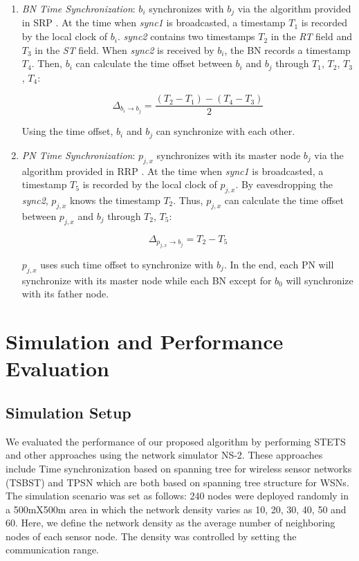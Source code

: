 \documentclass[runningheads,a4paper]{llncs}
\begin{document}
\begin{enumerate}
\item \textit{BN Time Synchronization}: $ b_{i}$ synchronizes with $ b_{j}$ via the algorithm provided in SRP \cite{5}. At the time when \textit{sync1} is broadcasted, a timestamp $ T_{1}$ is recorded by the local clock of $ b_{i}$. \textit{sync2} contains two timestamps $ T_{2}$ in the \textit{RT} field and $ T_{3}$ in the \textit{ST} field. When \textit{sync2} is received by $ b_{i}$, the BN records a timestamp $ T_{4}$. Then, $ b_{i}$ can calculate the time offset between $ b_{i}$ and $ b_{j}$ through $ T_{1}$, $ T_{2}$, $ T_{3}$, $ T_{4}$:

\begin{equation}
\label{eq1}
\Delta_{b_{i} \to b_{j} } =\frac{\left( {T_{2} -T_{1} }
\right)-\left( {T_{4} -T_{3} } \right)}{2}
\end{equation}

Using the time offset, $ b_{i}$ and $ b_{j}$ can synchronize with each other.

\item \textit{PN Time Synchronization}: $p_{j,x}$ synchronizes with its master node $ b_{j}$ via the algorithm provided in RRP \cite{3}. At the time when \textit{sync1} is broadcasted, a timestamp $ T_{5}$ is recorded by the local clock of $p_{j,x}$. By eavesdropping the \textit{sync2}, $p_{j,x}$ knows the timestamp $ T_{2}$. Thus, $p_{j,x}$ can calculate the time offset between $p_{j,x}$ and $ b_{j}$ through $ T_{2}$, $ T_{5}$:

\begin{equation}
\label{eq4}
\Delta_{p_{j,x} \to b_{j} } =T_{2} -T_{5}
\end{equation}

$p_{j,x}$ uses such time offset to synchronize with $ b_{j}$. In the end, each PN will synchronize with its master node while each BN except for $b_{0}$ will synchronize with its father node.

\end{enumerate}


\section{Simulation and Performance Evaluation}
\subsection{Simulation Setup}
We evaluated the performance of our proposed algorithm by performing STETS and other approaches using the network simulator NS-2. These approaches include Time synchronization based on spanning tree for wireless sensor networks (TSBST) \cite{6} and TPSN \cite{5} which are both based on spanning tree structure for WSNs. The simulation scenario was set as follows: 240 nodes were deployed randomly in a 500mX500m area in which the network density varies as 10, 20, 30, 40, 50 and 60. Here, we define the network density as the average number of neighboring nodes of each sensor node. The density was controlled by setting the communication range.
\end{document}
